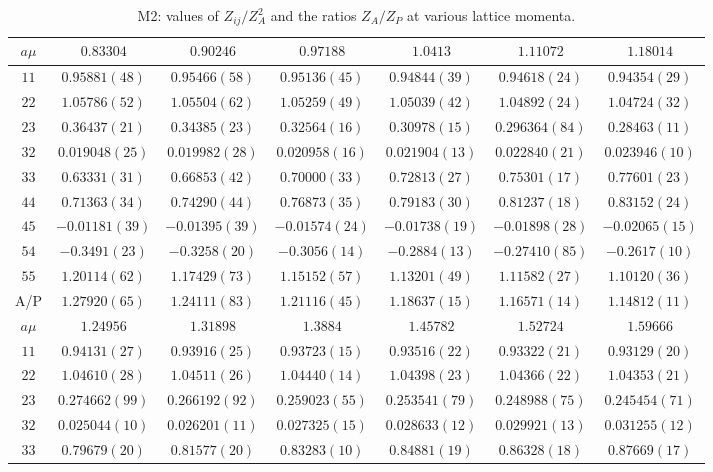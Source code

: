 \begin{table}
\begin{center}
\caption{M2: values of $Z_{ij}/Z_A^2$ and the ratios $Z_A/Z_P$ at various lattice momenta.}
\begin{tabular}{c|c c c c c c}
\hline
\hline
$a\mu$ & $0.83304$ & $0.90246$ & $0.97188$ & $1.0413$ & $1.11072$ & $1.18014$ \\
\hline
$11$ & $0.95881(48)$ & $0.95466(58)$ & $0.95136(45)$ & $0.94844(39)$ & $0.94618(24)$ & $0.94354(29)$ \\
$22$ & $1.05786(52)$ & $1.05504(62)$ & $1.05259(49)$ & $1.05039(42)$ & $1.04892(24)$ & $1.04724(32)$ \\
$23$ & $0.36437(21)$ & $0.34385(23)$ & $0.32564(16)$ & $0.30978(15)$ & $0.296364(84)$ & $0.28463(11)$ \\
$32$ & $0.019048(25)$ & $0.019982(28)$ & $0.020958(16)$ & $0.021904(13)$ & $0.022840(21)$ & $0.023946(10)$ \\
$33$ & $0.63331(31)$ & $0.66853(42)$ & $0.70000(33)$ & $0.72813(27)$ & $0.75301(17)$ & $0.77601(23)$ \\
$44$ & $0.71363(34)$ & $0.74290(44)$ & $0.76873(35)$ & $0.79183(30)$ & $0.81237(18)$ & $0.83152(24)$ \\
$45$ & $-0.01181(39)$ & $-0.01395(39)$ & $-0.01574(24)$ & $-0.01738(19)$ & $-0.01898(28)$ & $-0.02065(15)$ \\
$54$ & $-0.3491(23)$ & $-0.3258(20)$ & $-0.3056(14)$ & $-0.2884(13)$ & $-0.27410(85)$ & $-0.2617(10)$ \\
$55$ & $1.20114(62)$ & $1.17429(73)$ & $1.15152(57)$ & $1.13201(49)$ & $1.11582(27)$ & $1.10120(36)$ \\
\hline
A/P & $1.27920(65)$ & $1.24111(83)$ & $1.21116(45)$ & $1.18637(15)$ & $1.16571(14)$ & $1.14812(11)$ \\
\hline
$a\mu$ & $1.24956$ & $1.31898$ & $1.3884$ & $1.45782$ & $1.52724$ & $1.59666$ \\
\hline
$11$ & $0.94131(27)$ & $0.93916(25)$ & $0.93723(15)$ & $0.93516(22)$ & $0.93322(21)$ & $0.93129(20)$ \\
$22$ & $1.04610(28)$ & $1.04511(26)$ & $1.04440(14)$ & $1.04398(23)$ & $1.04366(22)$ & $1.04353(21)$ \\
$23$ & $0.274662(99)$ & $0.266192(92)$ & $0.259023(55)$ & $0.253541(79)$ & $0.248988(75)$ & $0.245454(71)$ \\
$32$ & $0.025044(10)$ & $0.026201(11)$ & $0.027325(15)$ & $0.028633(12)$ & $0.029921(13)$ & $0.031255(12)$ \\
$33$ & $0.79679(20)$ & $0.81577(20)$ & $0.83283(10)$ & $0.84881(19)$ & $0.86328(18)$ & $0.87669(17)$ \\

\end{tabular}
\end{center}
\end{table}
